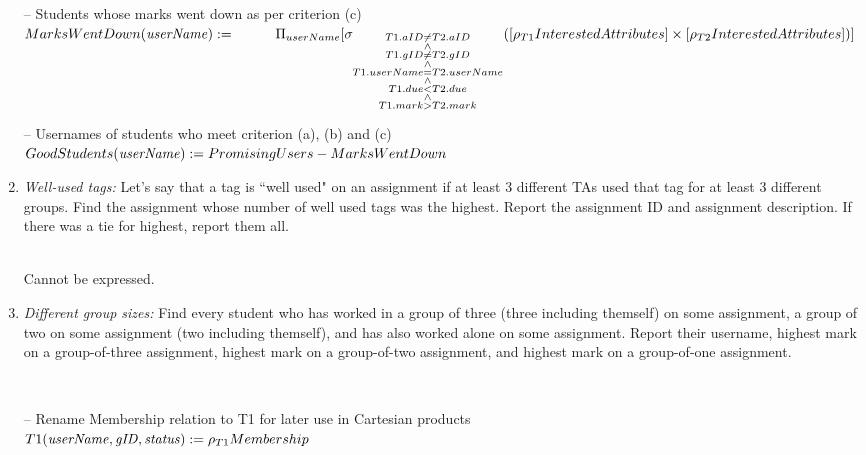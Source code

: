 \documentclass{article}
\newcommand{\var}[1]{\mathit{#1}}
\begin{document}
\begin{enumerate}
{-- Students whose marks went down as per criterion (c) \\[5pt]
$
MarksWentDown(\var{userName}) := \\[5pt]
    \hspace*{1cm}
	\Pi_{userName}
	[\sigma_{\substack{T1.aID \neq T2.aID \\ \wedge \\ T1.gID \neq T2.gID \\ \wedge \\ T1.userName = T2.userName \\ \wedge \\ T1.due < T2.due \\ \wedge \\ T1.mark > T2.mark}} 
	([\rho_{T1}InterestedAttributes] \times [\rho_{T2}InterestedAttributes])] \\[10pt]
$

-- Usernames of students who meet criterion (a), (b) and (c) \\[5pt]
$
GoodStudents(\var{userName}) :=
	PromisingUsers - MarksWentDown \\[10pt]
$
} %

\newpage

\item   %
\textit{Well-used tags:} 
Let's say that a tag is ``well used" on an assignment if at least 3 different TAs
used that tag for at least 3 different groups.
Find the assignment whose number of well used tags was the highest.
Report the assignment ID and assignment description.
If there was a tie for highest, report them all.

{~}\\ %
{\large %
Cannot be expressed. \\[10pt]
} %

\newpage

\item   %
\textit{Different group sizes:} 
Find every student who has worked in a group of three (three including themself) on some assignment,
a group of two on some assignment (two including themself), and
has also worked alone on some assignment.
Report their username,
highest mark on a group-of-three assignment,
highest mark on a group-of-two assignment,
and highest mark on a group-of-one assignment.

{~}\\ %
{\large %
-- Rename Membership relation to T1 for later use in Cartesian products \\[5pt]
$
T1(\var{userName, gID, status}) :=
    \rho_{T1} Membership \\[10pt]
$

}
\end{enumerate}
\end{document}
